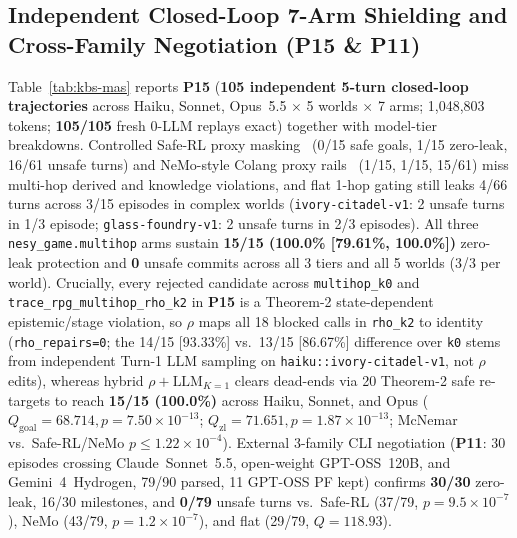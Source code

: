 \subsection{Independent Closed-Loop 7-Arm Shielding and Cross-Family Negotiation (\textbf{P15} \& \textbf{P11})}
Table~\ref{tab:kbs-mas} reports \textbf{P15} (\textbf{105 independent 5-turn closed-loop trajectories} across Haiku, Sonnet, Opus~5.5 $\times$ 5 worlds $\times$ 7 arms; 1,048,803 tokens; \textbf{105/105} fresh 0-LLM replays exact) together with model-tier breakdowns. Controlled Safe-RL proxy masking~\cite{alshiekh2018shield} (0/15 safe goals, 1/15 zero-leak, 16/61 unsafe turns) and NeMo-style Colang proxy rails~\cite{rebedea2023nemo} (1/15, 1/15, 15/61) miss multi-hop derived and knowledge violations, and flat 1-hop gating still leaks 4/66 turns across 3/15 episodes in complex worlds (\texttt{ivory-citadel-v1}: 2 unsafe turns in 1/3 episode; \texttt{glass-foundry-v1}: 2 unsafe turns in 2/3 episodes). All three \texttt{nesy\_game.multihop} arms sustain \textbf{15/15 (100.0\% [79.61\%, 100.0\%])} zero-leak protection and \textbf{0} unsafe commits across all 3 tiers and all 5 worlds (3/3 per world). Crucially, every rejected candidate across \texttt{multihop\_k0} and \texttt{trace\_rpg\_multihop\_rho\_k2} in \textbf{P15} is a Theorem-2 state-dependent epistemic/stage violation, so $\rho$ maps all 18 blocked calls in \texttt{rho\_k2} to identity (\texttt{rho\_repairs=0}; the 14/15 [93.33\%] vs.\ 13/15 [86.67\%] difference over \texttt{k0} stems from independent Turn-1 LLM sampling on \texttt{haiku::ivory-citadel-v1}, not $\rho$ edits), whereas hybrid $\rho{+}\text{LLM}_{K=1}$ clears dead-ends via 20 Theorem-2 safe re-targets to reach \textbf{15/15 (100.0\%)} across Haiku, Sonnet, and Opus ($Q_{\mathrm{goal}}{=}68.714, p{=}7.50{\times}10^{-13}$; $Q_{\mathrm{zl}}{=}71.651, p{=}1.87{\times}10^{-13}$; McNemar vs.\ Safe-RL/NeMo $p{\le}1.22{\times}10^{-4}$). External 3-family CLI negotiation (\textbf{P11}: 30 episodes crossing Claude~Sonnet~5.5, open-weight GPT-OSS~120B, and Gemini~4~Hydrogen, 79/90 parsed, 11 GPT-OSS PF kept) confirms \textbf{30/30} zero-leak, 16/30 milestones, and \textbf{0/79} unsafe turns vs.\ Safe-RL (37/79, $p{=}9.5{\times}10^{-7}$), NeMo (43/79, $p{=}1.2{\times}10^{-7}$), and flat (29/79, $Q{=}118.93$).

